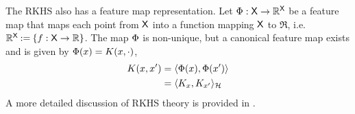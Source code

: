 The RKHS also has a feature map representation. Let $\Phi: {\sf X} \to \mathbb{R}^{\sf X}$ be a feature map that maps each point from ${\sf X}$ into a function mapping ${\sf X}$ to $\Re$, i.e. $\mathbb{R}^{\sf X} \mathbin{:=} \{f: {\sf X} \to \mathbb{R} \}$. The map $\Phi$ is non-unique, but a canonical feature map exists and is given by $\Phi(x)  =  K(x,\cdot)$, %
\begin{equation}
\begin{aligned}
\Kern(x,x') &= \langle \featuremap(x), \featuremap(x')\rangle \\
& = \langle \Kern_x, \Kern_{x'} \rangle_\clH
\end{aligned}
\label{e:rkhs_feature_map}
\end{equation}
A more detailed discussion of RKHS theory is provided in .
%
%

